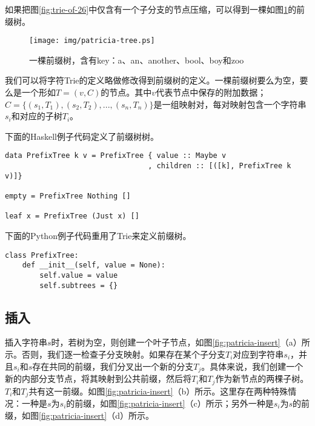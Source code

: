 \documentclass[UTF8]{article}
\begin{document}
如果把图\ref{fig:trie-of-26}中仅含有一个子分支的节点压缩，可以得到一棵如图\ref{fig:patricia-tree}的前缀树。

\begin{figure}[htbp]
  \centering
  \texttt{[image: img/patricia-tree.ps]}
  \caption{一棵前缀树，含有key：a、an、another、bool、boy和zoo}
  \label{fig:patricia-tree}
\end{figure}

我们可以将字符Trie的定义略做修改得到前缀树的定义。一棵前缀树要么为空，要么是一个形如$T = (v, C)$的节点。其中$v$代表节点中保存的附加数据；$C = \{(s_1, T_1), (s_2, T_2), ..., (s_n, T_n)\}$是一组映射对，每对映射包含一个字符串$s_i$和对应的子树$T_i$。

下面的Haskell例子代码定义了前缀树树。

\lstset{language=Haskell}
\begin{lstlisting}[style=Haskell]
data PrefixTree k v = PrefixTree { value :: Maybe v
                                 , children :: [([k], PrefixTree k v)]}

empty = PrefixTree Nothing []

leaf x = PrefixTree (Just x) []
\end{lstlisting}

下面的Python例子代码重用了Trie来定义前缀树。

\lstset{language=Python}
\begin{lstlisting}
class PrefixTree:
    def __init__(self, value = None):
        self.value = value
        self.subtrees = {}
\end{lstlisting}

\subsection{插入}

插入字符串$s$时，若树为空，则创建一个叶子节点，如图\ref{fig:patricia-insert}（a）所示。否则，我们逐一检查子分支映射。如果存在某个子分支$T_i$对应到字符串$s_i$，并且$s_i$和$s$存在共同的前缀，我们分叉出一个新的分支$T_j$。具体来说，我们创建一个新的内部分支节点，将其映射到公共前缀，然后将$T_i$和$T_j$作为新节点的两棵子树。$T_i$和$T_j$共有这一前缀。如图\ref{fig:patricia-insert}（b）所示。这里存在两种特殊情况：一种是$s$为$s_i$的前缀，如图\ref{fig:patricia-insert}（c）所示；另外一种是$s_i$为$s$的前缀，如图\ref{fig:patricia-insert}（d）所示。
\end{document}
